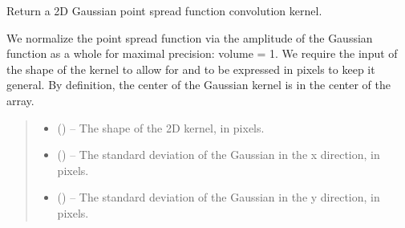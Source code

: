 \documentclass[letterpaper,11pt,english]{sphinxmanual}
\begin{document}

\begin{savenotes}\begin{fulllineitems}
\label{\detokenize{code/lezargus.library.atmosphere:lezargus.library.atmosphere.gaussian_psf_kernel}}
\pysigstartsignatures
{}
\pysigstopsignatures
\sphinxAtStartPar
Return a 2D Gaussian point spread function convolution kernel.

\sphinxAtStartPar
We normalize the point spread function via the amplitude of the Gaussian
function as a whole for maximal precision: volume = 1. We require the
input of the shape of the kernel to allow for  and 
to be expressed in pixels to keep it general. By definition, the center
of the Gaussian kernel is in the center of the array.
\begin{quote}\begin{description}
\begin{itemize}
\item {} 
\sphinxAtStartPar
{} () – The shape of the 2D kernel, in pixels.

\item {} 
\sphinxAtStartPar
{} () – The standard deviation of the Gaussian in the x direction, in pixels.

\item {} 
\sphinxAtStartPar
{} () – The standard deviation of the Gaussian in the y direction, in pixels.


\end{itemize}
\end{description}
\end{quote}
\end{fulllineitems}
\end{savenotes}
\end{document}
